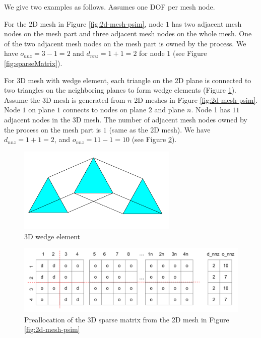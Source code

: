 \documentclass[11pt]{article}  %
\begin{document}
 We give two examples as follows. Assumes one DOF per mesh node.
 
For the 2D mesh in Figure \ref{fig:2d-mesh-psim}, node $1$ has two adjacent mesh nodes on the mesh part and three  adjacent mesh nodes on the whole mesh. One of the  two adjacent mesh nodes on the mesh part is owned by the process.   We have $o_{nnz}  = 3 - 1=2$ and $d_{nnz}=1+1=2$ for node 1 (see Figure \ref{fig:sparseMatrix}).

For 3D mesh with wedge element, each triangle on the 2D plane is connected to two triangles on the neighboring planes to form wedge elements (Figure \ref{fig:3DElment}).  Assume the 3D mesh is generated from $n$ 2D meshes in  Figure \ref{fig:2d-mesh-psim}. Node $1$ on plane $1$ connects to nodes on plane $2$ and plane $n$. Node 1 has $11$ adjacent nodes in the 3D mesh.  The number of  adjacent mesh nodes owned by the process  on the mesh part  is $1$  (same as the 2D mesh).  We have $d_{nnz}=1+1=2$, and $o_{nnz}  = 11 - 1 =10$ (see Figure \ref{fig:sparseMatrix3D}). 

\begin{figure}
\center
\includegraphics[width=3in]{fig/3DElment.png}
\caption{\small{3D wedge element}} 
\label{fig:3DElment}
\end{figure}

\begin{figure}
\center
\includegraphics[width=5.5in]{fig/sparseMatrix3D.png}
\caption{\small{Preallocation of the 3D sparse matrix from the 2D mesh in Figure \ref{fig:2d-mesh-psim} }}
\label{fig:sparseMatrix3D}
\end{figure}
\end{document}
